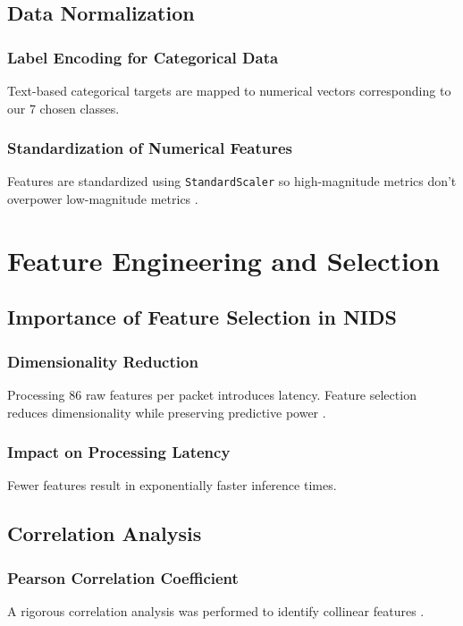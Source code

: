 \documentclass[12pt, a4paper]{report}
\begin{document}
\section{Data Normalization}
\subsection{Label Encoding for Categorical Data}
Text-based categorical targets are mapped to numerical vectors corresponding to our 7 chosen classes.
\subsection{Standardization of Numerical Features}
Features are standardized using \texttt{StandardScaler} so high-magnitude metrics don't overpower low-magnitude metrics \cite{ref7}.

\chapter{Feature Engineering and Selection}
\section{Importance of Feature Selection in NIDS}
\subsection{Dimensionality Reduction}
Processing 86 raw features per packet introduces latency. Feature selection reduces dimensionality while preserving predictive power \cite{ref8}.
\subsection{Impact on Processing Latency}
Fewer features result in exponentially faster inference times.

\section{Correlation Analysis}
\subsection{Pearson Correlation Coefficient}
A rigorous correlation analysis was performed to identify collinear features \cite{ref9}.
\end{document}
